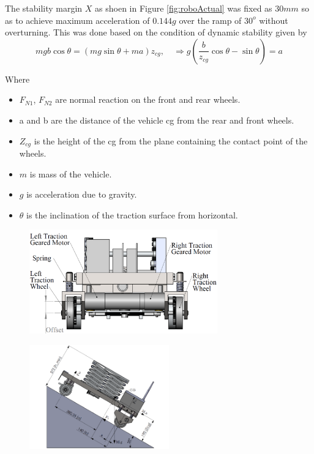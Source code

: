 The stability margin $X$ as shoen in Figure \ref{fig:roboActual} was fixed as $30mm$ so as to achieve  maximum acceleration of $0.144g$  over the ramp of $30^o$ without overturning. This was done based on the condition of dynamic stability given by
\begin{equation}
\label{eqn:overturn}
mgb\cos\theta=(mg\sin\theta+ma)z_{cg}, \quad \Rightarrow g(\frac{b}{z_{cg}}\cos\theta-\sin\theta)=a
\end{equation}


Where 
\begin{itemize}
\item[] $F_{N1}$, $F_{N2}$ are normal reaction on the front and rear wheels.
\item[] a and b are the distance of the vehicle cg from the rear and front wheels.
\item [] $Z_{cg}$ is the height of the cg from the  plane containing the contact point of the wheels.
\item [] $m$ is mass of the vehicle.
\item [] $g$ is acceleration due to gravity.
\item[] $\theta$ is the inclination of the traction surface from horizontal.
\end{itemize}


 
\begin{figure}
 	\centering
 	\begin{minipage}{.5\textwidth}
 		\centering
 		\includegraphics[width=.9\linewidth,height=4.5cm,keepaspectratio]{Chapter3/fig/WheelOffset}
 		\label{fig:tractionDrive}
 	\end{minipage}%
 	\begin{minipage}{.5\textwidth}
 		\centering
 		\includegraphics[height=4.5cm,keepaspectratio]{Chapter3/fig/loadDist}
 		\label{fig:loadDistribution}
 	\end{minipage}
 \end{figure}
